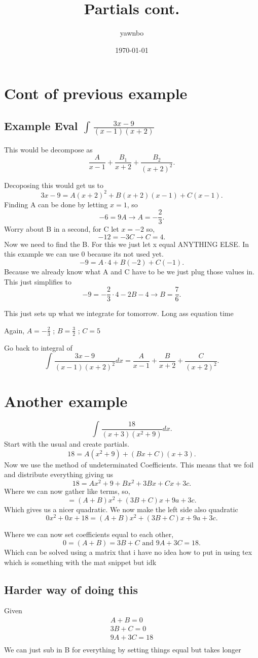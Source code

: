 \documentclass[a4paper]{article}
\title{Partials cont.}
\author{yawnbo}
\date{\today}
\begin{document}
\section{Cont of previous example}
\subsection{Example Eval $\int_{}^{} \frac{3x-9}{(x-1)(x+2)} $}%

This would be decompose as
\[
\frac{A}{x-1}+\frac{B_{1}}{x+2}+\frac{B_{2}}{(x+2)^2}
.\] 
\newpage

Decoposing this would get us to 
\[
3x-9=A(x+2)^2+B(x+2)(x-1)+C(x-1)
.\] 
Finding A can be done by letting $x=1$, so 
\[
-6=9A \to A=-\frac{2}{3}
.\] 
Worry about B in a second, for C let $x=-2$ so,
\[
-12=-3C \to C=4
.\] 
Now we need to find the B. For this we just let x equal ANYTHING ELSE. In this example we can use 0 because its not used yet.
\[
-9=A\cdot 4 + B(-2)+C(-1)
.\] 
Because we already know what A and C have to be we just plug those values in.
This just simplifies to 
\[
-9=-\frac{2}{3}\cdot 4 - 2B- 4 \to B=\frac{7}{6}
.\] 

This just sets up what we integrate for tomorrow. Long ass equation time

Again, $A=-\frac{2}{3}$ ; $B=\frac{3}{2}$ ; $C=5$ 

Go back to integral of
\[
\int_{}^{} \frac{3x-9}{(x-1)(x+2)^2}dx=\frac{A}{x-1}+\frac{B}{x+2}+\frac{C}{(x+2)^2} 
.\] 

\section{Another example}%
\label{sec:Another example}
\[
\int_{}^{} \frac{18}{(x+3)(x^2+9)}dx 
.\] 
Start with the usual and create partials. 
\[
18=A(x^2+9)+(Bx+C)(x+3)
.\] 
Now we use the method of undeterminated Coefficients. This means that we foil and distribute everything giving us
\[
18=Ax^2+9+Bx^2+3Bx+Cx+3c
.\] 
Where we can now gather like terms, so,
\[
=(A+B)x^2+(3B+C)x+9a+3c
.\] 
Which gives us a nicer quadratic. We now make the left side also quadratic
\[
0x^2+0x+18 = (A+B)x^2+(3B+C)x+9a+3c
.\] 

Where we can now set coefficients equal to each other,
\[
0=(A+B) = 3B+C \text{ and }9A+3C = 18
.\] 
\newpage
Which can be solved using a matrix that i have no idea how to put in using tex which is something with the mat snippet but idk

\subsection{Harder way of doing this}%
\label{sub:Harder way of doing this}
Given
\begin{gather*}
A+B=0 \\
3B+C=0\\
9A+3C=18 \\
\end{gather*}
We can just sub in B for everything by setting things equal but takes longer
\end{document}
